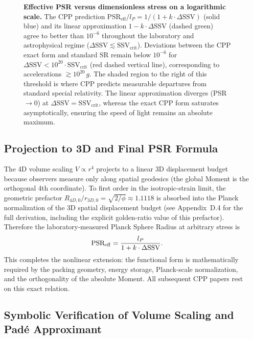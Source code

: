 \documentclass[11pt,letterpaper]{article}
\begin{document}
\begin{figure}[H]
  \centering
  
  \caption{%
    \textbf{Effective PSR versus dimensionless stress on a logarithmic scale.}
    The CPP prediction $\text{PSR}_{\text{eff}}/l_P = 1/(1 + k\cdot\Delta\text{SSV})$
    (solid blue) and its linear approximation $1 - k\cdot\Delta\text{SSV}$
    (dashed green) agree to better than $10^{-6}$ throughout the laboratory and
    astrophysical regime ($\Delta\text{SSV} \lesssim \text{SSV}_{\text{crit}}$).
    Deviations between the CPP exact form and standard SR remain below $10^{-6}$
    for $\Delta\text{SSV} < 10^{20}\cdot\text{SSV}_{\text{crit}}$ (red dashed
    vertical line), corresponding to accelerations $\gtrsim 10^{20}\,g$.
    The shaded region to the right of this threshold is where CPP predicts
    measurable departures from standard special relativity. The linear
    approximation diverges (PSR$\to 0$) at $\Delta\text{SSV} = \text{SSV}_{\text{crit}}$,
    whereas the exact CPP form saturates asymptotically, ensuring the speed of
    light remains an absolute maximum.
  }
  \label{fig:psrcurve}
\end{figure}





\subsection{Projection to 3D and Final PSR Formula}

The 4D volume scaling $V \propto r^4$ projects to a linear 3D displacement budget because observers measure only along spatial geodesics (the global Moment is the orthogonal 4th coordinate). To first order in the isotropic-strain limit, the geometric prefactor $R_{4D,0}/r_{3D,0} = \sqrt{2/\phi} \approx 1.1118$ is absorbed into the Planck normalization of the 3D spatial displacement budget (see Appendix~D.4 for the full derivation, including the explicit golden-ratio value of this prefactor). Therefore the laboratory-measured Planck Sphere Radius at arbitrary stress is
\[
\text{PSR}_{\rm eff} = \frac{l_P}{1 + k \cdot \Delta\text{SSV}}.
\] 
This completes the nonlinear extension: the functional form is mathematically required by the packing geometry, energy storage, Planck-scale normalization, and the orthogonality of the absolute Moment. All subsequent CPP papers rest on this exact relation.

\subsection{Symbolic Verification of Volume Scaling and Padé Approximant}
\end{document}
